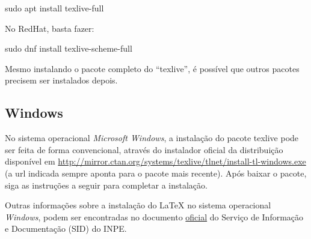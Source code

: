 \begin{commandshell}
sudo apt install texlive-full
\end{commandshell}


No RedHat, basta fazer:


\begin{commandshell}
sudo dnf install texlive-scheme-full
\end{commandshell}


\begin{marker}
Mesmo instalando o pacote completo do ``texlive'', é possível que outros pacotes precisem ser instalados depois.
\end{marker}

\subsection*{Windows}
\label{sec:windows}

No sistema operacional \textit{Microsoft Windows}, a instalação do pacote texlive pode ser feita de forma convencional, através do instalador oficial da distribuição disponível em \url{http://mirror.ctan.org/systems/texlive/tlnet/install-tl-windows.exe} (a url indicada sempre aponta para o pacote mais recente). Após baixar o pacote, siga as instruções a seguir para completar a instalação.

\begin{marker}
Outras informações sobre a instalação do LaTeX no sistema operacional \textit{Windows}, podem ser encontradas no documento \href{http://mtc-m16d.sid.inpe.br/col/sid.inpe.br/mtc-m19@80/2010/03.24.15.12/doc/ambiente_latex_no_windows.pdf}{oficial} do Serviço de Informação e Documentação (SID) do INPE.
\end{marker}

